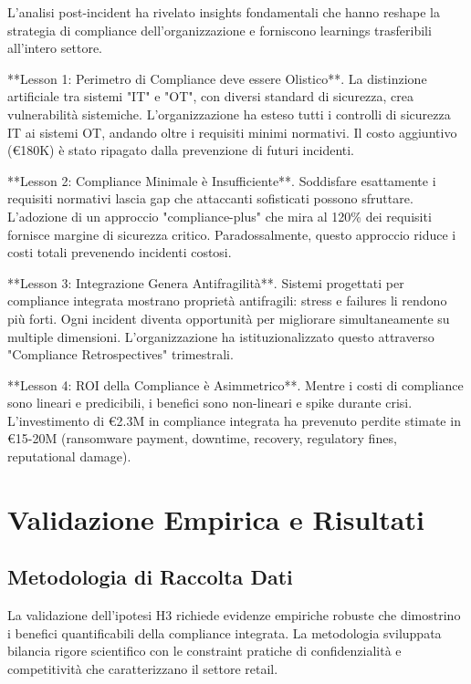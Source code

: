 L'analisi post-incident ha rivelato insights fondamentali che hanno reshape la strategia di compliance dell'organizzazione e forniscono learnings trasferibili all'intero settore.

**Lesson 1: Perimetro di Compliance deve essere Olistico**. La distinzione artificiale tra sistemi "IT" e "OT", con diversi standard di sicurezza, crea vulnerabilità sistemiche. L'organizzazione ha esteso tutti i controlli di sicurezza IT ai sistemi OT, andando oltre i requisiti minimi normativi. Il costo aggiuntivo (€180K) è stato ripagato dalla prevenzione di futuri incidenti.

**Lesson 2: Compliance Minimale è Insufficiente**. Soddisfare esattamente i requisiti normativi lascia gap che attaccanti sofisticati possono sfruttare. L'adozione di un approccio "compliance-plus" che mira al 120\% dei requisiti fornisce margine di sicurezza critico. Paradossalmente, questo approccio riduce i costi totali prevenendo incidenti costosi.

**Lesson 3: Integrazione Genera Antifragilità**. Sistemi progettati per compliance integrata mostrano proprietà antifragili: stress e failures li rendono più forti. Ogni incident diventa opportunità per migliorare simultaneamente su multiple dimensioni. L'organizzazione ha istituzionalizzato questo attraverso "Compliance Retrospectives" trimestrali.

**Lesson 4: ROI della Compliance è Asimmetrico**. Mentre i costi di compliance sono lineari e predicibili, i benefici sono non-lineari e spike durante crisi. L'investimento di €2.3M in compliance integrata ha prevenuto perdite stimate in €15-20M (ransomware payment, downtime, recovery, regulatory fines, reputational damage).

\section{Validazione Empirica e Risultati}

\subsection{Metodologia di Raccolta Dati}

La validazione dell'ipotesi H3 richiede evidenze empiriche robuste che dimostrino i benefici quantificabili della compliance integrata. La metodologia sviluppata bilancia rigore scientifico con le constraint pratiche di confidenzialità e competitività che caratterizzano il settore retail.


